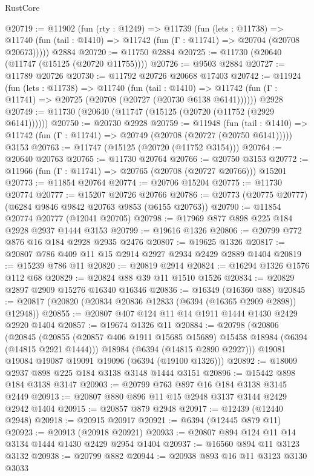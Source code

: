\begin{lexlean}{RustCore}
\begin{coremodule}
@20719 := @11902
    (fun (rty : @1249) =>
    @11739
      (fun (lets : @11738) =>
      @11740 (fun (tail : @1410) => @11742 (fun (Γ : @11741) => @20704 (@20708 @20673)))))
    @2884
@20720 := @11750 @2884
@20725 := @11730 (@20640 (@11747 (@15125 (@20720 @11755))))
@20726 := @9503 @2884
@20727 := @11789 @20726
@20730 := @11792 @20726 @20668 @17403
@20742 := @11924
    (fun (lets : @11738) =>
    @11740
      (fun (tail : @1410) =>
      @11742 (fun (Γ : @11741) => @20725 (@20708 (@20727 (@20730 @6138 @6141))))))
    @2928
@20749 := @11730 (@20640 (@11747 (@15125 (@20720 (@11752 (@2929 @6141))))))
@20750 := @20730 @2928
@20759 := @11948
    (fun (tail : @1410) => @11742 (fun (Γ : @11741) => @20749 (@20708 (@20727 (@20750 @6141)))))
    @3153
@20763 := @11747 (@15125 (@20720 (@11752 @3154)))
@20764 := @20640 @20763
@20765 := @11730 @20764
@20766 := @20750 @3153
@20772 := @11966 (fun (Γ : @11741) => @20765 (@20708 (@20727 @20766))) @15201
@20773 := @11854 @20764
@20774 := @20706 @15204
@20775 := @11730 @20774
@20777 := @15207 @20726 @20766
@20786 := @20773 (@20775 @20777) (@6284 @9846 @9842 @20763 @9853 (@6155 @20763))
@20790 := @11854 @20774 @20777 (@12041 @20705)
@20798 := @17969 @877 @898 @225 @184 @2928 @2937 @1444 @3153
@20799 := @19616 @1326
@20806 := @20799 @772 @876 @16 @184 @2928 @2935 @2476
@20807 := @19625 @1326
@20817 := @20807 @786 @409 @11 @15 @2914 @2927 @2934 @2429 @2889 @1404
@20819 := @15239 @786 @11
@20820 := @20819 @2914
@20824 := @16294 @1326 @1576 @112 @68
@20829 := @20824 @88 @39 @11 @1510 @1526
@20834 := @20829 @2897 @2909 @15276 @16340 @16346
@20836 := @16349 (@16360 @88)
@20845 := @20817 (@20820 (@20834 @20836 @12833 (@6394 (@16365 @2909 @2898)) @12948))
@20855 := @20807 @407 @124 @11 @14 @1911 @1444 @1430 @2429 @2920 @1404
@20857 := @19674 @1326 @11
@20884 := @20798
    (@20806
      (@20845
        (@20855 (@20857 @406 @1911 @15685 @15689) @15458 @18984 (@6394 (@14815 @2921 @1444)))
        @18984
        (@6394 (@14815 @2890 @2927)))
      @19081
      @19084
      @19087
      @19091
      @19096
      (@6394 (@19100 @1326)))
@20892 := @18009 @2937 @898 @225 @184 @3138 @3148 @1444 @3151
@20896 := @15442 @898 @184 @3138 @3147
@20903 := @20799 @763 @897 @16 @184 @3138 @3145 @2449
@20913 := @20807 @880 @896 @11 @15 @2948 @3137 @3144 @2429 @2942 @1404
@20915 := @20857 @879 @2948
@20917 := @12439 (@12440 @2948)
@20918 := @20915 @20917
@20921 := @6394 (@12445 @879 @11)
@20923 := @20913 (@20918 @20921)
@20933 := @20807 @894 @124 @11 @14 @3134 @1444 @1430 @2429 @2954 @1404
@20937 := @16560 @894 @11 @3123 @3132
@20938 := @20799 @882
@20944 := @20938 @893 @16 @11 @3123 @3130 @3033

\end{coremodule}
\end{lexlean}
